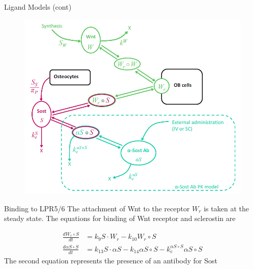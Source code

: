 \documentclass{beamer}
\begin{document}
\begin{frame}{Ligand Models (cont)}
			\begin{figure}[h]
		\centering
			\includegraphics[scale=0.45]{../Figures/fig_lemaire_fig2.png}
	\end{figure}
	
\end{frame}

\begin{frame}{Binding to LPR5/6}
The attachment of Wnt to the receptor $W_r$ is taken at the steady state. 
The equations for binding of Wnt receptor and sclerostin are

\begin{equation}
	\begin{split}
		\frac{d W_r \circ S}{dt} &= k_9 S \cdot W_r - k_{10} W_r \circ S \\
		\frac{d \alpha S  \circ S}{dt} &= k_{13} S \cdot \alpha S - k_{14} \alpha S \circ S -k_e^{\alpha S \circ S} \alpha S \circ S 
	\end{split}
\end{equation}
The second equation represents the presence of an antibody for Sost
\end{frame}
\end{document}
